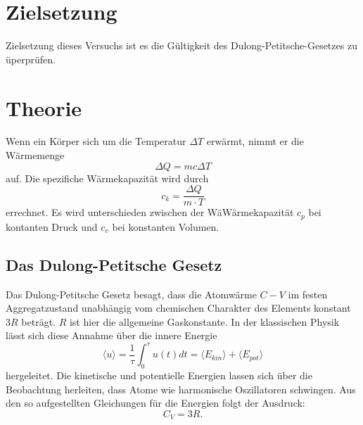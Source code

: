 \section{Zielsetzung}
Zielsetzung dieses Versuchs ist es die Gültigkeit des Dulong-Petitsche-Gesetzes zu üperprüfen.
\section{Theorie}
\label{sec:Theorie}
Wenn ein Körper sich um die Temperatur $\Delta T$ erwärmt, nimmt er die Wärmemenge
\begin{equation}
\Delta Q = m c \Delta T
\end{equation}
auf.
Die spezifiche Wärmekapazität wird durch
\begin{equation}
c_k = \frac{\Delta Q}{m \cdot T}
\end{equation}
errechnet.
Es wird unterschieden zwischen der WäWärmekapazität $c_p$ bei kontanten Druck und $c_v$ bei konstanten Volumen.
\subsection{Das Dulong-Petitsche Gesetz}
Das Dulong-Petitsche Gesetz besagt, dass die Atomwärme $C-V$ im festen Aggregatzustand unabhängig vom chemischen Charakter des Elements konstant $3R$ beträgt.
$R$ ist hier die allgemeine Gaskonstante.
 In der klassischen Physik lässt sich diese Annahme über die innere Energie
 \begin{equation}
 \langle u \rangle = \frac{1}{\tau} \int_0 ^\tau u(t)dt = \langle E_{kin} \rangle + \langle E_{pot} \rangle
 \end{equation}
hergeleitet.
Die kinetische und potentielle Energien lassen sich über die Beobachtung herleiten, dass Atome wie harmonische Oszillatoren schwingen.
Aus den so aufgestellten Gleichungen für die Energien folgt der Ausdruck:
\begin{equation}
C_V = 3R .
\end{equation}
